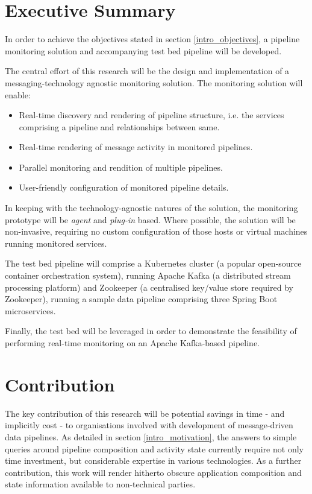 \section{Executive Summary} \label{exec_summary}

In order to achieve the objectives stated in section \ref{intro_objectives}, a pipeline monitoring solution and accompanying test bed pipeline will be developed.

The central effort of this research will be the design and implementation of a messaging-technology agnostic  monitoring solution. The monitoring solution will enable:

\begin{itemize}
	\item Real-time discovery and rendering of pipeline structure, i.e. the services comprising a pipeline and relationships between same.
	\item Real-time rendering of message activity in monitored pipelines.
	\item Parallel monitoring and rendition of multiple pipelines. 
	\item User-friendly configuration of monitored pipeline details.
	
\end{itemize}

In keeping with the technology-agnostic natures of the solution, the monitoring prototype will be \textit{agent} and \textit{plug-in} based\cite{Maamar:2000:OSA:351936.351955}. Where possible, the solution will be non-invasive, requiring no custom configuration of those hosts or virtual machines running monitored services.

The test bed pipeline will comprise a Kubernetes cluster (a popular open-source container orchestration system), running Apache Kafka (a distributed stream processing platform) and Zookeeper (a centralised key/value store required by Zookeeper),  running a sample data pipeline comprising three Spring Boot microservices.

Finally, the test bed will be leveraged in order to demonstrate the feasibility of performing real-time monitoring on an Apache Kafka-based pipeline.

\section{Contribution}
The key contribution of this research will be potential savings in time - and implicitly cost - to organisations involved with development of message-driven data pipelines. As detailed in section \ref{intro_motivation}, the answers to simple queries around pipeline composition and activity state currently require not only time investment, but considerable expertise in various technologies. As a further contribution, this work will render hitherto obscure application composition and state information available to non-technical parties.


